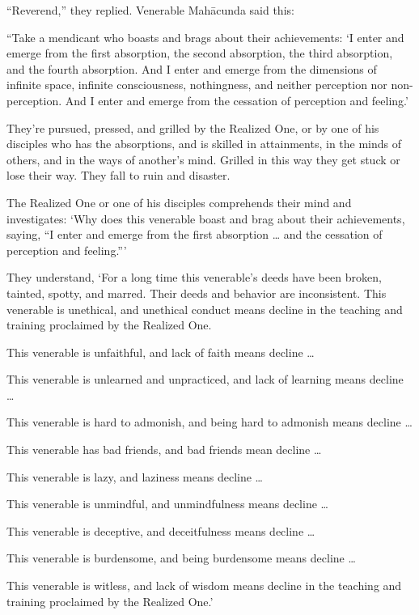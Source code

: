 \documentclass[12pt,openany]{book}%
\begin{document}
“Reverend,” they replied. Venerable \textsanskrit{Mahācunda} said this: 

“Take a mendicant who boasts and brags about their achievements: ‘I enter and emerge from the first absorption, the second absorption, the third absorption, and the fourth absorption. And I enter and emerge from the dimensions of infinite space, infinite consciousness, nothingness, and neither perception nor non-perception. And I enter and emerge from the cessation of perception and feeling.’ 

They’re pursued, pressed, and grilled by the Realized One, or by one of his disciples who has the absorptions, and is skilled in attainments, in the minds of others, and in the ways of another’s mind. Grilled in this way they get stuck or lose their way. They fall to ruin and disaster. 

The Realized One or one of his disciples comprehends their mind and investigates: ‘Why does this venerable boast and brag about their achievements, saying, “I enter and emerge from the first absorption … and the cessation of perception and feeling.”’ 

They understand, ‘For a long time this venerable’s deeds have been broken, tainted, spotty, and marred. Their deeds and behavior are inconsistent. This venerable is unethical, and unethical conduct means decline in the teaching and training proclaimed by the Realized One. 

This venerable is unfaithful, and lack of faith means decline … 

This venerable is unlearned and unpracticed, and lack of learning means decline … 

This venerable is hard to admonish, and being hard to admonish means decline … 

This venerable has bad friends, and bad friends mean decline … 

This venerable is lazy, and laziness means decline … 

This venerable is unmindful, and unmindfulness means decline … 

This venerable is deceptive, and deceitfulness means decline … 

This venerable is burdensome, and being burdensome means decline … 

This venerable is witless, and lack of wisdom means decline in the teaching and training proclaimed by the Realized One.’ 
\end{document}
